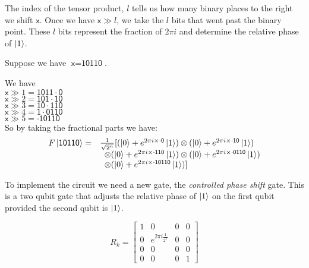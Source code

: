 
\frmrule

The index of the tensor product, $l$ tells us how many binary places to the right we shift $\textsf{x}$. 
Once we have $\textsf{x} \gg l$, we take the $l$ bits that went past the binary point.
These $l$ bits represent the fraction of $2 \pi i$ and determine the relative phase of $\left|1\right\rangle$.

\frmrule

\begin{example}
Suppose we have $\textsf{x} = \textsf{10110}$.

We have \\
$\textsf{x} \gg 1 = \textsf{1011}\cdot\textsf{0}$ \\
$\textsf{x} \gg 2 = \textsf{101}\cdot\textsf{10}$ \\
$\textsf{x} \gg 3 = \textsf{10}\cdot\textsf{110}$ \\
$\textsf{x} \gg 4 = \textsf{1}\cdot\textsf{0110}$ \\
$\textsf{x} \gg 5 = \cdot\textsf{10110}$ \\

So by taking the fractional parts we have:
\[ 
\begin{array}{rl}
    F\left|\textsf{10110}\right\rangle =&  \frac{1}{\sqrt{2^n}} [(\left|0\right\rangle + e^{2\pi i \times \cdot\textsf{0}}\left|1\right\rangle)
    \otimes (\left|0\right\rangle + e^{2\pi i \times \cdot\textsf{10}}\left|1\right\rangle)
    \\& \; \;
    \otimes (\left|0\right\rangle + e^{2\pi i \times \cdot\textsf{110}}\left|1\right\rangle)
    \otimes (\left|0\right\rangle + e^{2\pi i \times \cdot\textsf{0110}}\left|1\right\rangle) 
    \\& \; \;
    \otimes (\left|0\right\rangle + e^{2\pi i \times \cdot\textsf{10110}}\left|1\right\rangle)]
\end{array}
\]  




\end{example}




\frmrule


To implement the circuit we need a new gate, the \textit{controlled phase shift} gate.
This is a two qubit gate that adjusts the relative phase of $\left|1\right\rangle$ on the first qubit provided 
the second qubit is $\left|1\right\rangle$.

$$
R_k = \begin{bmatrix}
       1 & 0 & 0 & 0                        \\[0.3em]
       0 & e^{2\pi i \frac{1}{2^k}} & 0 & 0 \\[0.3em]
       0 & 0 & 0 & 0 \\[0.3em]
       0 & 0 & 0 & 1
     \end{bmatrix}
$$


